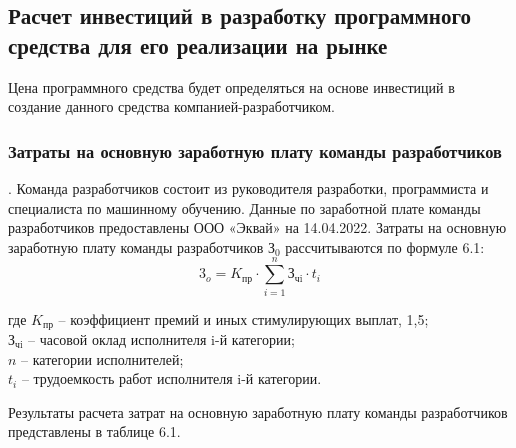 \subsection{Расчет инвестиций в разработку программного средства для его реализации на рынке}

Цена программного средства будет определяться на основе инвестиций в создание данного средства компанией-разработчиком.

\subsubsection{Затраты на основную заработную плату команды разработчиков}. Команда разработчиков состоит из руководителя разработки, программиста и специалиста по машинному обучению.
Данные по заработной плате команды разработчиков предоставлены ООО «Эквай» на 14.04.2022.
Затраты на основную заработную плату команды разработчиков $\text{З}_0$ рассчитываются по формуле 6.1:
\begin{equation}
	\text{3}_o = K_{\text{пр}} \cdot \sum_{i=1}^{n}{\text{З}_{\text{чi}} \cdot t_i}
\end{equation}
\begin{explanation}
	где $K_{\text{пр}}$ – коэффициент премий и иных стимулирующих выплат, 1,5; \\
	$\text{З}_{\text{чi}}$ – часовой оклад исполнителя i-й категории; \\
	$n$ – категории исполнителей; \\
	$t_i$ – трудоемкость работ исполнителя i-й категории.
\end{explanation}

Результаты расчета затрат на основную заработную плату команды разработчиков представлены в таблице 6.1.

